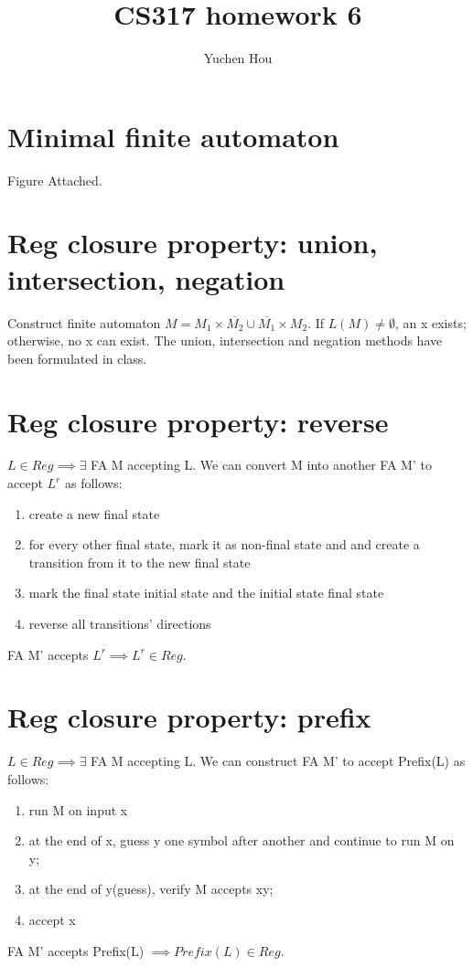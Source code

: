 \documentclass{article}
\begin{document}
\lstset{language=Java}
\title{CS317 homework 6}
\author{Yuchen Hou}
\maketitle

\section{Minimal finite automaton}
Figure Attached.

\section{Reg closure property: union, intersection, negation}
Construct finite automaton $M = M_1 \times \overline{M_2} \cup \overline{M_1}
\times M_2$. If $L(M) \neq \emptyset$, an x exists; otherwise, no x can exist.
The union, intersection and negation methods have been formulated in class.

\section{Reg closure property: reverse}
$L \in Reg \implies \exists$ FA M accepting L. We can convert M into another
FA M' to accept $L^r$ as follows:
\begin{enumerate}
  \item create a new final state
  \item for every other final state, mark it as non-final state and and create
  a transition from it to the new final state
  \item mark the final state initial state and the initial state final state
  \item reverse all transitions' directions
\end{enumerate}
FA M' accepts $L^r \implies L^r \in Reg$.

\section{Reg closure property: prefix}
$L \in Reg \implies \exists$ FA M accepting L. We can construct FA M' to accept
Prefix(L) as follows:
\begin{enumerate}
  \item run M on input x
  \item at the end of x, guess y one symbol after another and continue to run M
  on y;
  \item at the end of y(guess), verify M accepts xy;
  \item accept x
\end{enumerate}
FA M' accepts Prefix(L) $\implies Prefix(L) \in Reg$.
\end{document}
